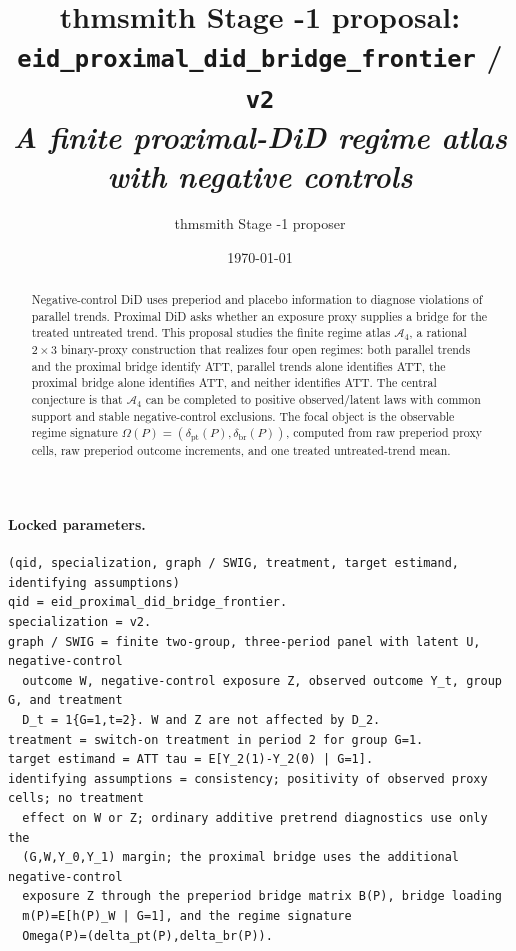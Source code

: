 \documentclass[11pt]{article}
\title{thmsmith Stage -1 proposal: \texttt{eid\_proximal\_did\_bridge\_frontier} / \texttt{v2}%
  \\ \large\textit{A finite proximal-DiD regime atlas with negative controls}}
\author{thmsmith Stage -1 proposer}
\date{\today}
\theoremstyle{definition}
\theoremstyle{plain}
\theoremstyle{remark}
\begin{document}
\maketitle


\paragraph{Locked parameters.}
\begin{verbatim}
(qid, specialization, graph / SWIG, treatment, target estimand, identifying assumptions)
qid = eid_proximal_did_bridge_frontier.
specialization = v2.
graph / SWIG = finite two-group, three-period panel with latent U, negative-control
  outcome W, negative-control exposure Z, observed outcome Y_t, group G, and treatment
  D_t = 1{G=1,t=2}. W and Z are not affected by D_2.
treatment = switch-on treatment in period 2 for group G=1.
target estimand = ATT tau = E[Y_2(1)-Y_2(0) | G=1].
identifying assumptions = consistency; positivity of observed proxy cells; no treatment
  effect on W or Z; ordinary additive pretrend diagnostics use only the
  (G,W,Y_0,Y_1) margin; the proximal bridge uses the additional negative-control
  exposure Z through the preperiod bridge matrix B(P), bridge loading
  m(P)=E[h(P)_W | G=1], and the regime signature
  Omega(P)=(delta_pt(P),delta_br(P)).
\end{verbatim}

\begin{abstract}
Negative-control DiD uses preperiod and placebo information to diagnose violations of parallel trends. Proximal DiD asks whether an exposure proxy supplies a bridge for the treated untreated trend. This proposal studies the finite regime atlas \(\mathcal A_4\), a rational \(2\times3\) binary-proxy construction that realizes four open regimes: both parallel trends and the proximal bridge identify ATT, parallel trends alone identifies ATT, the proximal bridge alone identifies ATT, and neither identifies ATT. The central conjecture is that \(\mathcal A_4\) can be completed to positive observed/latent laws with common support and stable negative-control exclusions. The focal object is the observable regime signature \(\Omega(P)=(\delta_{\mathrm{pt}}(P),\delta_{\mathrm{br}}(P))\), computed from raw preperiod proxy cells, raw preperiod outcome increments, and one treated untreated-trend mean.
\end{abstract}
\end{document}
